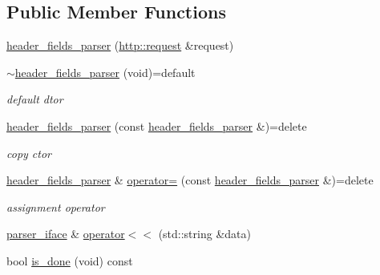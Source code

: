 \subsection*{Public Member Functions}
\begin{DoxyCompactItemize}
\item 
\hyperlink{classnetflex_1_1parsing_1_1header__fields__parser_a062871b585ec94f1ef3039237debfd4f}{header\+\_\+fields\+\_\+parser} (\hyperlink{classnetflex_1_1http_1_1request}{http\+::request} \&request)
\item 
\mbox{\label{classnetflex_1_1parsing_1_1header__fields__parser_ae6497c8612a0200de763a5b91c574398}} 
\hyperlink{classnetflex_1_1parsing_1_1header__fields__parser_ae6497c8612a0200de763a5b91c574398}{$\sim$header\+\_\+fields\+\_\+parser} (void)=default
\begin{DoxyCompactList}\small\item\em default dtor \end{DoxyCompactList}\item 
\mbox{\label{classnetflex_1_1parsing_1_1header__fields__parser_a09177036c57944df36217a024e64de3f}} 
\hyperlink{classnetflex_1_1parsing_1_1header__fields__parser_a09177036c57944df36217a024e64de3f}{header\+\_\+fields\+\_\+parser} (const \hyperlink{classnetflex_1_1parsing_1_1header__fields__parser}{header\+\_\+fields\+\_\+parser} \&)=delete
\begin{DoxyCompactList}\small\item\em copy ctor \end{DoxyCompactList}\item 
\mbox{\label{classnetflex_1_1parsing_1_1header__fields__parser_aebe26ebcd6cccc0e010eaa82a2173d91}} 
\hyperlink{classnetflex_1_1parsing_1_1header__fields__parser}{header\+\_\+fields\+\_\+parser} \& \hyperlink{classnetflex_1_1parsing_1_1header__fields__parser_aebe26ebcd6cccc0e010eaa82a2173d91}{operator=} (const \hyperlink{classnetflex_1_1parsing_1_1header__fields__parser}{header\+\_\+fields\+\_\+parser} \&)=delete
\begin{DoxyCompactList}\small\item\em assignment operator \end{DoxyCompactList}\item 
\hyperlink{classnetflex_1_1parsing_1_1parser__iface}{parser\+\_\+iface} \& \hyperlink{classnetflex_1_1parsing_1_1header__fields__parser_a4ba3f5dad38f3f9ef9bf3632f02d4111}{operator$<$$<$} (std\+::string \&data)
\item 
bool \hyperlink{classnetflex_1_1parsing_1_1header__fields__parser_a8303c3f2910b9baa68b9b0313e0438cf}{is\+\_\+done} (void) const
\end{DoxyCompactItemize}
